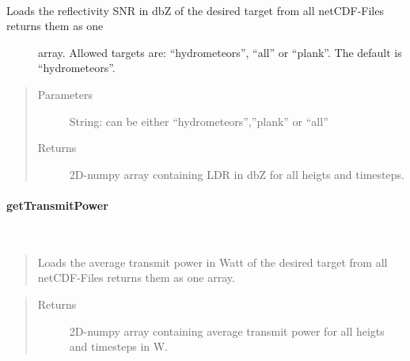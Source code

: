 \documentclass[letterpaper,10pt,english]{sphinxmanual}
\begin{document}
\begin{fulllineitems}
\begin{fulllineitems}
\label{\detokenize{generated/MPPy.Instruments.Radar.Radar.getSNR:MPPy.Instruments.Radar.Radar.getSNR}}~\begin{description}
\item[{Loads the reflectivity SNR in dbZ of the desired target from all netCDF-Files returns them as one}] \leavevmode
array. Allowed targets are: “hydrometeors”, “all” or “plank”. The default is “hydrometeors”.

\end{description}
\begin{quote}\begin{description}
\item[{Parameters}] \leavevmode
{} \textendash{} String: can be either “hydrometeors”,”plank” or “all”

\item[{Returns}] \leavevmode
2D-numpy array containing LDR in dbZ for all heigts and timesteps.

\end{description}\end{quote}

\end{fulllineitems}



\paragraph{getTransmitPower}
\label{\detokenize{generated/MPPy.Instruments.Radar.Radar.getTransmitPower:gettransmitpower}}\label{\detokenize{generated/MPPy.Instruments.Radar.Radar.getTransmitPower::doc}}

\begin{fulllineitems}
\label{\detokenize{generated/MPPy.Instruments.Radar.Radar.getTransmitPower:MPPy.Instruments.Radar.Radar.getTransmitPower}}~\begin{quote}

Loads the average transmit power in Watt of the desired target from all netCDF-Files returns them as one
array.
\end{quote}
\begin{quote}\begin{description}
\item[{Returns}] \leavevmode
2D-numpy array containing average transmit power for all heigts and timesteps in W.


\end{description}
\end{quote}
\end{fulllineitems}
\end{fulllineitems}
\end{document}

